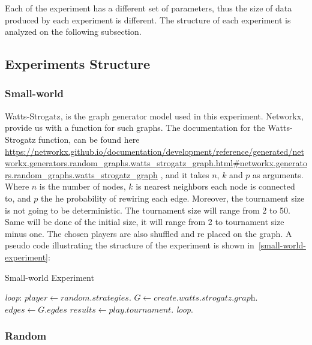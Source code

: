 Each of the experiment has a different set of parameters, thus the size of
data produced by each experiment is different. The structure of each experiment
is analyzed on the following subsection.

\subsection{Experiments Structure}
\subsubsection{Small-world}

Watts-Strogatz, is the graph generator model used in this experiment. Networkx,
provide us with a function for such graphs. The documentation for the
Watts-Strogatz function, can be found here
\url{https://networkx.github.io/documentation/development/reference/generated/networkx.generators.random_graphs.watts_strogatz_graph.html#networkx.generators.random_graphs.watts_strogatz_graph}
, and it takes \(n\), \(k\) and \(p\) as arguments. Where \(n\) is the number
of nodes, \(k\) is nearest neighbors each node is connected to, and \(p\) the
he probability of rewiring each edge. Moreover, the tournament size is not
going to be deterministic. The tournament size will range from 2 to 50.
Same will be done of the initial size, it will range from 2 to tournament size
minus one. The chosen players are also shuffled and re placed on the graph.
A pseudo code illustrating the structure of the experiment is shown in~\ref{small-world-experiment}:

\begin{algorithm}
  \caption{Small-world Experiment}\label{small-world-experiment}
  \begin{algorithmic}
  \BState \emph{loop}:
  \State $player \gets \textit{random.strategies}$.
  \State $G \gets \textit{create.watts.strogatz.graph}$.
  \State $edges \gets \textit{G.egdes}$
  \State $results \gets \textit{play.tournament}$.
  \emph{loop}.
  \EndFor
  \EndFor
  \EndFor
  \EndFor
  \EndProcedure
  \end{algorithmic}
\end{algorithm}

\subsubsection{Random}

